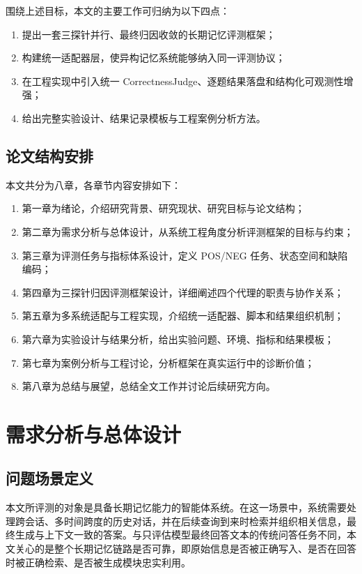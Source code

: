 围绕上述目标，本文的主要工作可归纳为以下四点：

\begin{enumerate}
    \item 提出一套三探针并行、最终归因收敛的长期记忆评测框架；
    \item 构建统一适配器层，使异构记忆系统能够纳入同一评测协议；
    \item 在工程实现中引入统一 CorrectnessJudge、逐题结果落盘和结构化可观测性增强；
    \item 给出完整实验设计、结果记录模板与工程案例分析方法。
\end{enumerate}

\section{论文结构安排}

本文共分为八章，各章节内容安排如下：

\begin{enumerate}
    \item 第一章为绪论，介绍研究背景、研究现状、研究目标与论文结构；
    \item 第二章为需求分析与总体设计，从系统工程角度分析评测框架的目标与约束；
    \item 第三章为评测任务与指标体系设计，定义 POS/NEG 任务、状态空间和缺陷编码；
    \item 第四章为三探针归因评测框架设计，详细阐述四个代理的职责与协作关系；
    \item 第五章为多系统适配与工程实现，介绍统一适配器、脚本和结果组织机制；
    \item 第六章为实验设计与结果分析，给出实验问题、环境、指标和结果模板；
    \item 第七章为案例分析与工程讨论，分析框架在真实运行中的诊断价值；
    \item 第八章为总结与展望，总结全文工作并讨论后续研究方向。
\end{enumerate}

\chapter{需求分析与总体设计}

\section{问题场景定义}

本文所评测的对象是具备长期记忆能力的智能体系统。在这一场景中，系统需要处理跨会话、多时间跨度的历史对话，并在后续查询到来时检索并组织相关信息，最终生成与上下文一致的答案。与只评估模型最终回答文本的传统问答任务不同，本文关心的是整个长期记忆链路是否可靠，即原始信息是否被正确写入、是否在回答时被正确检索、是否被生成模块忠实利用。


